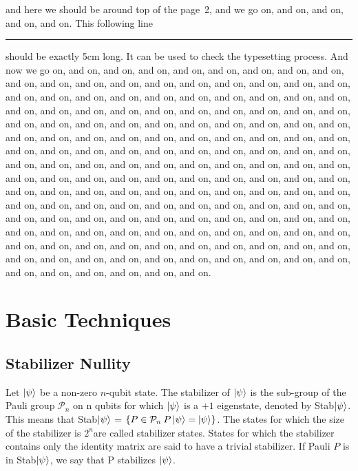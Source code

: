 \documentclass[12pt]{dalthesis}
\begin{document}
and here we should be around top of the page~2, and we go on, and on, and on, and on, and on.
This following line \rule{5cm}{1pt} should be exactly 5cm long.  It
can be used to check the typesetting process.
And now we go on,
and on, and on, and on, and on, and on, and on, and on, and on, and on,
and on, and on, and on, and on, and on, and on, and on, and on, and on,
and on, and on, and on, and on, and on, and on, and on, and on, and on,
and on, and on, and on, and on, and on, and on, and on, and on, and on,
and on, and on, and on, and on, and on, and on, and on, and on, and on,
and on, and on, and on, and on, and on, and on, and on, and on, and on,
and on, and on, and on, and on, and on, and on, and on, and on, and on,
and on, and on, and on, and on, and on, and on, and on, and on, and on,
and on, and on, and on, and on, and on, and on, and on, and on, and on,
and on, and on, and on, and on, and on, and on, and on, and on, and on,
and on, and on, and on, and on, and on, and on, and on, and on, and on,
and on, and on, and on, and on, and on, and on, and on, and on, and on,
and on, and on, and on, and on, and on, and on, and on, and on, and on,
and on, and on, and on, and on, and on, and on, and on, and on, and on,
and on, and on, and on, and on, and on, and on, and on, and on, and on,
and on, and on, and on, and on, and on, and on, and on, and on, and on,
and on, and on, and on, and on, and on, and on, and on, and on, and on,
and on.


\chapter{Basic Techniques}

\section{Stabilizer Nullity}

\begin{definition}[Stabilizer]
Let $\ket{\psi}$ be a non-zero $n$-qubit state. The stabilizer of $\ket{\psi}$ is the sub-group of the Pauli group $\mathcal{P}_n$ on n qubits for which $\ket{\psi}$ is a $+1$ eigenstate, denoted by Stab$\ket{\psi}$. This means that Stab$\ket{\psi}$ = $\{P \in \mathcal{P}_n \: P \ket{\psi} = \ket{\psi} \}$. The states for which the size of the stabilizer is $2^n$are called stabilizer states. States for which the stabilizer contains only the identity matrix are said to have a trivial stabilizer. If Pauli $P$ is in Stab$\ket{\psi}$, we say that P stabilizes $\ket{\psi}$.
\end{definition}
\end{document}
